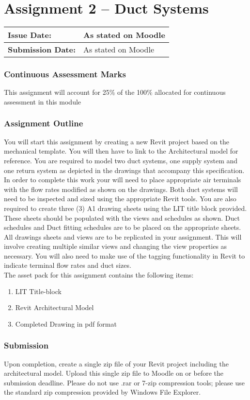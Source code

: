 
	
\part*{Assignment 2 – Duct Systems}

\begin{tabularx}{\textwidth}{ |X|X| }
	\hline
	\textbf{Issue Date:} & As stated on Moodle \\
	\hline 
	\textbf{Submission Date:}  & As stated on Moodle  \\
	\hline
\end{tabularx}


\section*{Continuous Assessment Marks}
This assignment will account for 25\% of the 100\% allocated for continuous assessment in this module

\section*{Assignment Outline}
You will start this assignment by creating a new Revit project based on the mechanical template.  You will then have to link to the Architectural model for reference.  You are required to model two duct systems, one supply system and one return system as depicted in the drawings that accompany this specification. In order to complete this work your will need to place appropriate air terminals with the flow rates modified as shown on the drawings. Both duct systems will need to be inspected and sized using the appropriate Revit tools. You are also required to create three (3) A1 drawing sheets using the LIT title block provided. These sheets should be populated with the views and schedules as shown.  Duct schedules and Duct fitting schedules are to be placed on the appropriate sheets. All drawings sheets and views are to be replicated in your assignment. This will involve creating multiple similar views and changing the view properties as necessary. You will also need to make use of the tagging functionality in Revit to indicate terminal flow rates and duct sizes.\\


The asset pack for this assignment contains the following items:
\begin{enumerate}
	\item LIT Title-block
	\item Revit Architectural Model
	\item Completed Drawing in pdf format
\end{enumerate}


\section*{Submission}
Upon completion, create a single zip file of your Revit project including the architectural model. Upload this single zip file to Moodle on or before the submission deadline.  Please do not use .rar or 7-zip compression tools; please use the standard zip compression provided by Windows File Explorer.

